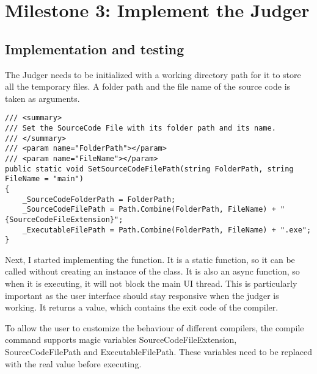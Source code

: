 \documentclass[report.tex]{subfiles}
\begin{document}
\section{Milestone 3: Implement the Judger}

\subsection{Implementation and testing}

The Judger needs to be initialized with a working directory path for it to store all the temporary files. A folder path and the file name of the source code is taken as arguments.

\begin{verbatim}
/// <summary>
/// Set the SourceCode File with its folder path and its name.
/// </summary>
/// <param name="FolderPath"></param>
/// <param name="FileName"></param>
public static void SetSourceCodeFilePath(string FolderPath, string FileName = "main")
{
    _SourceCodeFolderPath = FolderPath;
    _SourceCodeFilePath = Path.Combine(FolderPath, FileName) + "{SourceCodeFileExtension}";
    _ExecutableFilePath = Path.Combine(FolderPath, FileName) + ".exe";
}
\end{verbatim}

Next, I started implementing the  function. It is a static function, so it can be called without creating an instance of the class. It is also an async function, so when it is executing, it will not block the main UI thread. This is particularly important as the user interface should stay responsive when the judger is working. It returns a  value, which contains the exit code of the compiler.

To allow the user to customize the behaviour of different compilers, the compile command supports magic variables SourceCodeFileExtension, SourceCodeFilePath and ExecutableFilePath. These variables need to be replaced with the real value before executing.
\end{document}
